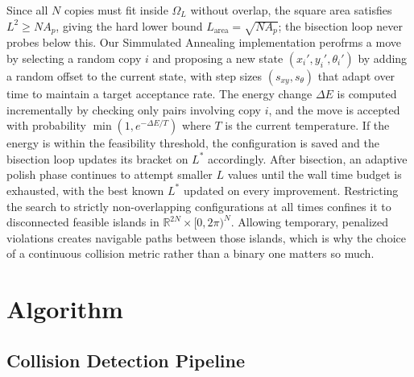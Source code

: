 \documentclass[10pt,twocolumn]{article}
\begin{document}
Since all $N$ copies must fit inside $\Omega_L$ without overlap, the
square area satisfies $L^2 \geq N A_p$, giving the hard lower bound
$L_{\mathrm{area}} = \sqrt{N A_p}$; the bisection loop never probes
below this. Our Simmulated Annealing implementation
perofrms a move by selecting a random copy $i$ and proposing a new state
$(x_i', y_i', \theta_i')$ by adding a random offset to the current state,
 with step sizes $(s_{xy}, s_\theta)$ that adapt over time to
  maintain a target acceptance rate.
   The energy change $\Delta E$ is computed incrementally by 
   checking only pairs involving copy $i$, and the move 
   is accepted with probability $\min(1, e^{-\Delta E/T})$ where $T$ is
    the current temperature. If the energy is within the 
feasibility threshold, the configuration is saved
and the bisection loop updates its bracket on $L^*$ accordingly. After
bisection, an adaptive polish phase continues to attempt smaller $L$ values until the wall time budget is exhausted, with the best known $L^*$ updated on every improvement.
 Restricting the search to strictly non-overlapping
configurations at all times confines it to disconnected feasible
islands in $\mathbb{R}^{2N} \times [0, 2\pi)^N$. Allowing temporary,
penalized violations creates navigable paths between those islands,
which is why the choice of a continuous collision metric rather than a
binary one matters so much.

\section{Algorithm}
\label{sec:algorithm}

\subsection{Collision Detection Pipeline}
\end{document}
